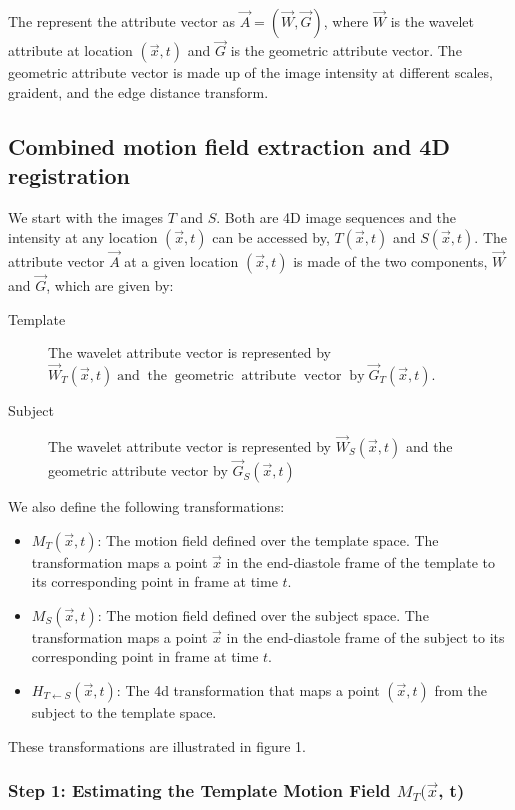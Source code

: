 \documentclass{article}
\newcommand{\tmop}[1]{\operatorname{#1}}
\newenvironment{itemizedot}
  {\begin{itemize}\renewcommand{\labelitemi}{$\bullet$}\renewcommand{\labelitemii}{$\bullet$}\renewcommand{\labelitemiii}{$\bullet$}\renewcommand{\labelitemiv}{$\bullet$}}{\end{itemize}}
\begin{document}
The represent the attribute vector as $\vec{A} = ( \vec{W}, \vec{G} )$, where
$\vec{W}$ is the wavelet attribute at location $( \vec{x}, t )$ and $\vec{G}$
is the geometric attribute vector. The geometric attribute vector is made up
of the image intensity at different scales, graident, and the edge distance
transform.

\subsection{Combined motion field extraction and 4D registration}

We start with the images $T$ and $S$. Both are 4D image sequences and the
intensity at any location $( \vec{x}, t )$ can be accessed by, $T ( \vec{x}, t
)$ and $S ( \vec{x}, t )$. The attribute vector $\vec{A}$ at a given location
$( \vec{x}, t )$  is made of the two components, $\vec{W}$ and $\vec{G}$,
which are given by:
\begin{description}
  \item[Template] The wavelet attribute vector is represented by $\vec{W}_T (
  \vec{x}, t ) \tmop{and} \tmop{the} \tmop{geometric} \tmop{attribute}
  \tmop{vector} \tmop{by} \vec{G}_T ( \vec{x}, t )$.
  
  \item[Subject] The wavelet attribute vector is represented by $\vec{W}_S (
  \vec{x}, t )$ and the geometric attribute vector by $\vec{G}_S ( \vec{x}, t
  )$
\end{description}
We also define the following transformations:
\begin{itemizedot}
  \item $M_T ( \vec{x}, t )$: The motion field defined over the template
  space. The transformation maps a point $\vec{x}$ in the end-diastole frame
  of the template to its corresponding point in frame at time $t$.
  
  \item $M_S ( \vec{x}, t )$: The motion field defined over the subject space.
  The transformation maps a point $\vec{x}$ in the end-diastole frame of the
  subject to its corresponding point in frame at time $t$.
  
  \item $H_{T \leftarrow S} ( \vec{x}, t )$: The 4d transformation that maps a
  point $( \vec{x}, t )$ from the subject to the template space.
\end{itemizedot}
These transformations are illustrated in figure 1.

\subsubsection{Step 1: Estimating the Template Motion Field $M_T ( \vec{x}
\text{}$, t)}
\end{document}
